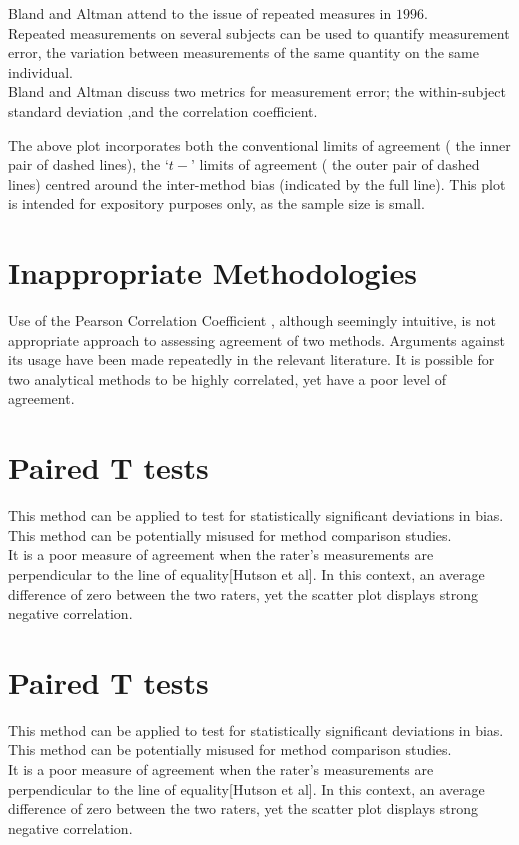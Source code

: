 \documentclass[12pt, a4paper]{report}
\theoremstyle{plain}
\theoremstyle{definition}
\theoremstyle{remark}
\begin{document}
	Bland and Altman attend to the issue of repeated measures in
	$1996$.
	\\
	Repeated measurements on several subjects can be used to quantify
	measurement error, the variation between measurements of the same
	quantity on the same individual.
	\\
	Bland and Altman discuss two metrics for measurement error; the
	within-subject standard deviation ,and the correlation
	coefficient.
	
	The above plot incorporates both the conventional limits of
	agreement ( the inner pair of dashed lines), the `$t-$' limits of
	agreement ( the outer pair of dashed lines) centred around the
	inter-method bias (indicated by the full line). This plot is
	intended for expository purposes only, as the sample size is
	small.
	
	
	
	
	
	
	\section{Inappropriate Methodologies} Use of the Pearson
	Correlation Coefficient , although seemingly intuitive, is not
	appropriate approach to assessing agreement of two methods.
	Arguments against its usage have been made repeatedly in the
	relevant literature. It is possible for two analytical methods to
	be highly correlated, yet have a poor level of agreement.


	\section{Paired T tests} This method can be applied to test for
	statistically significant deviations in bias. This method can be
	potentially misused for method comparison studies.
	\\It is a poor measure of agreement when the rater's measurements
	are perpendicular to the line of equality[Hutson et al]. In this
	context, an average difference of zero between the two raters, yet
	the scatter plot displays strong negative correlation.
	

	
	


			\section{Paired T tests} This method can be applied to test for
			statistically significant deviations in bias. This method can be
			potentially misused for method comparison studies.
			\\It is a poor measure of agreement when the rater's measurements
			are perpendicular to the line of equality[Hutson et al]. In this
			context, an average difference of zero between the two raters, yet
			the scatter plot displays strong negative correlation.
			
\end{document}
